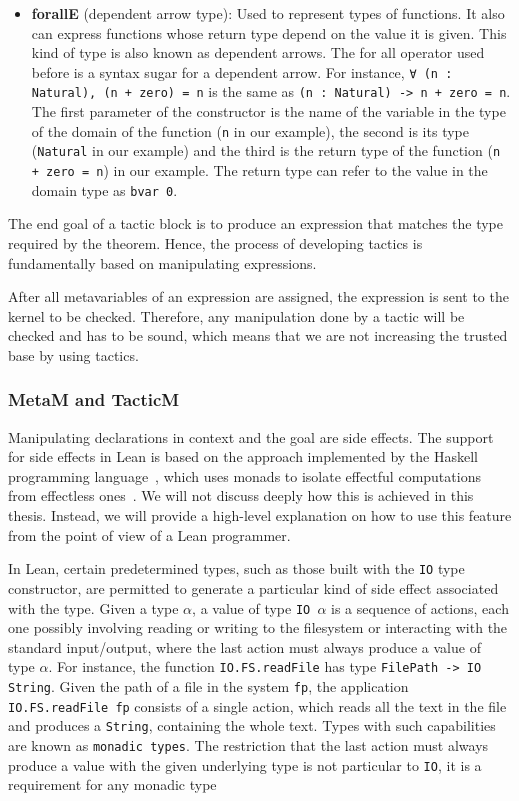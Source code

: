 \begin{itemize}
  \item \textbf{forallE} (dependent arrow type): Used to represent types of functions. It also can express functions whose return type depend on the value it is given. This kind of type is also known as dependent arrows. The for all operator used before is a syntax sugar for a dependent arrow. For instance, \texttt{∀ (n : Natural), (n + zero) = n} is the same as \texttt{(n : Natural) -> n + zero = n}. The first parameter of the constructor is the name of the variable in the type of the domain of the function (\texttt{n} in our example), the second is its type (\texttt{Natural} in our example) and the third is the return type of the function (\texttt{n + zero = n}) in our example. The return type can refer to the value in the domain type as \texttt{bvar 0}.
\end{itemize}

The end goal of a tactic block is to produce an expression that matches the type required by the theorem. Hence, the process of developing tactics is fundamentally based on manipulating expressions.

After all metavariables of an expression are assigned, the expression is sent to the kernel to be checked. Therefore, any manipulation done by a tactic will be checked and has to be sound, which means that we are not increasing the trusted base by using tactics.

\subsubsection{MetaM and TacticM}

Manipulating declarations in context and the goal are side effects. The support for side effects in Lean is based on the approach implemented by the Haskell programming language~\cite{haskell}, which uses monads to isolate effectful computations from effectless ones~\cite{imperativeFunctional}. We will not discuss deeply how this is achieved in this thesis. Instead, we will provide a high-level explanation on how to use this feature from the point of view of a Lean programmer.

In Lean, certain predetermined types, such as those built with the \texttt{IO} type constructor, are permitted to generate a particular kind of side effect associated with the type.
Given a type \texttt{$\alpha$}, a value of type \texttt{IO $\alpha$} is a sequence of actions, each one possibly involving reading or writing to the
filesystem or interacting with the standard input/output, where the last action must always produce a value of type \texttt{$\alpha$}. For instance,
the function \texttt{IO.FS.readFile} has type \texttt{FilePath -\textgreater\ IO String}. Given the path of a file in the system \texttt{fp}, the application \texttt{IO.FS.readFile fp} consists of a single action, which reads all the text in the file and produces a \texttt{String}, containing the whole text. Types with such capabilities are known as \texttt{monadic types}. The restriction that the last action must always produce a value with the given underlying type is not particular to \texttt{IO}, it is a requirement for any monadic type

